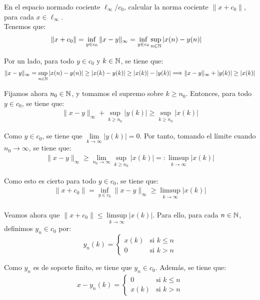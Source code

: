 \begin{ejercicio}
En el espacio normado cociente $\ell_\infty / c_0$, calcular la norma cociente $\|x + c_0\|$, para cada $x \in \ell_\infty$.\\

Tenemos que:
\begin{align*}
    \|x + c_0\| &= \inf\limits_{y \in c_0} \|x - y\|_\infty
    = \inf\limits_{y \in c_0} \sup\limits_{n \in \mathbb{N}} |x(n) - y(n)|
\end{align*}

Por un lado, para todo $y \in c_0$ y $k\in \mathbb{N}$, se tiene que:
\begin{align*}
    \|x - y\|_\infty = \sup\limits_{n \in \mathbb{N}} |x(n) - y(n)| \geq |x(k) - y(k)|\geq |x(k)| - |y(k)|
    \Longrightarrow \|x - y\|_\infty + |y(k)| \geq |x(k)|
\end{align*}

Fijamos ahora $n_0 \in \mathbb{N}$, y tomamos el supremo sobre $k\geq n_0$. Entonces, para todo $y \in c_0$, se tiene que:
\begin{align*}
    \|x - y\|_\infty + \sup\limits_{k \geq n_0} |y(k)| \geq \sup\limits_{k \geq n_0} |x(k)|
\end{align*}

Como $y \in c_0$, se tiene que $\lim\limits_{k \to \infty} |y(k)| = 0$. Por tanto, tomando el límite cuando $n_0 \to \infty$, se tiene que:
\begin{align*}
    \|x - y\|_\infty \geq \lim_{n_0 \to \infty} \sup\limits_{k \geq n_0} |x(k)| =: \limsup\limits_{k \to \infty} |x(k)|
\end{align*}

Como esto es cierto para todo $y \in c_0$, se tiene que:
\begin{align*}
    \|x + c_0\| = \inf\limits_{y \in c_0} \|x - y\|_\infty \geq \limsup\limits_{k \to \infty} |x(k)|
\end{align*}~\\

Veamos ahora que $\|x + c_0\| \leq \limsup\limits_{k \to \infty} |x(k)|$. Para ello, para cada $n\in \mathbb{N}$, definimos $y_n \in c_0$ por:
\begin{equation*}
    y_n(k) = \begin{cases}
        x(k) & \text{si } k \leq n\\
        0 & \text{si } k > n
    \end{cases}
\end{equation*}

Como $y_n$ es de soporte finito, se tiene que $y_n \in c_0$. Además, se tiene que:
\begin{align*}
    x-y_n(k) = \begin{cases}
        0 & \text{si } k \leq n\\
        x(k) & \text{si } k > n
    \end{cases}
\end{align*}


\end{ejercicio}
